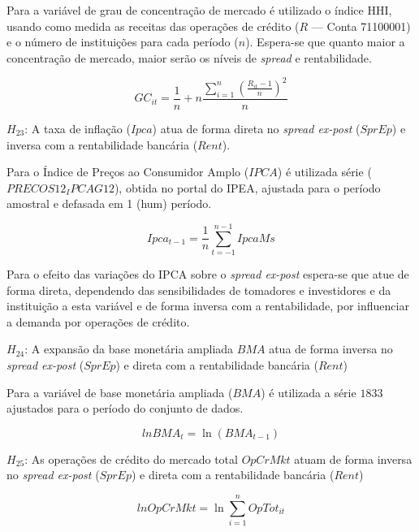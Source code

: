 \documentclass[
  12pt,
  12pt,
  openright,
  oneside,
  a4paper,
  chapter=TITLE,
  section=TITLE,
  subsection=TITLE,
  subsubsection=TITLE,
  portugues,
  sumario=tradicional]{abntex2}
\begin{document}
Para a variável de grau de concentração de mercado é utilizado o índice HHI, usando como medida as receitas das operações de crédito (\(R\) --- Conta 71100001) e o número de instituições para cada período (\(n\)). Espera-se que quanto maior a concentração de mercado, maior serão os níveis de \emph{spread} e rentabilidade.

\begin{equation}
GC_{it} = \frac{1}{n} + n\frac{\sum_{i=1}^{n}(\frac{R_{it} - 1}{n})^2}{n}
\end{equation}

\(H_{23}\): A taxa de inflação (\(Ipca\)) atua de forma direta no \emph{spread ex-post} (\(SprEp\)) e inversa com a rentabilidade bancária (\(Rent\)).

Para o Índice de Preços ao Consumidor Amplo (\(IPCA\)) é utilizada série (\(PRECOS12_IPCAG12\)), obtida no portal do IPEA, ajustada para o período amostral e defasada em 1 (hum) período.

\begin{equation}
Ipca_{t-1} = \frac{1}{n}\sum_{t=-1}^{n-1}IpcaMs
\end{equation}

Para o efeito das variações do IPCA sobre o \emph{spread ex-post} espera-se que atue de forma direta, dependendo das sensibilidades de tomadores e investidores e da instituição a esta variável e de forma inversa com a rentabilidade, por influenciar a demanda por operações de crédito.

\(H_{24}\): A expansão da base monetária ampliada \(BMA\) atua de forma inversa no \emph{spread ex-post} (\(SprEp\)) e direta com a rentabilidade bancária (\(Rent\))

Para a variável de base monetária ampliada (\(BMA\)) é utilizada a série \(1833\) ajustados para o período do conjunto de dados.

\begin{equation}
lnBMA_{t} = \ln(BMA_{t-1})
\end{equation}

\(H_{25}\): As operações de crédito do mercado total \(OpCrMkt\) atuam de forma inversa no \emph{spread ex-post} (\(SprEp\)) e direta com a rentabilidade bancária (\(Rent\))

\begin{equation}
lnOpCrMkt = \ln\sum_{i = 1}^nOpTot_{it}
\end{equation}

\vspace{20pt}
\vspace{-2mm}
\linespread{2}
\end{document}
